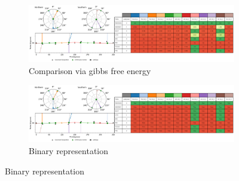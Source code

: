 \documentclass{article}
\begin{document}
\begin{figure}[H]
	\centering
	\begin{subfigure}[b]{1\textwidth}
		\includegraphics[width=1\textwidth,keepaspectratio]
		{figures/oxane/comp_tables/z_dataset-oxane-TS-all-groups-gibbs_group_WRMSD-table.png}
		\caption{Comparison via gibbs free energy}
	\end{subfigure}
	
	\begin{subfigure}[b]{1\textwidth}
		\includegraphics[width=1\textwidth,keepaspectratio]
		{figures/oxane/comp_tables/z_dataset-oxane-TS-all-groups-gibbs_comp-table.png}
		\caption{Binary representation}
	\end{subfigure}


\end{figure}
\end{document}
